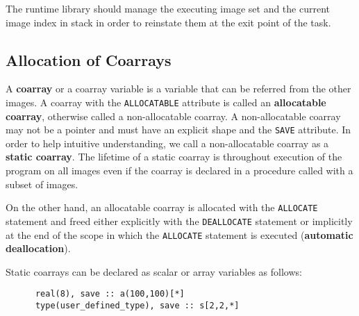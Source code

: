 
\requirement
The runtime library should manage the executing image set and the current image index 
in stack in order to reinstate them at the exit point of the task.


\subsection{Allocation of Coarrays}\label{sec:spec-coarray}

A {\bf coarray} or a coarray variable is a variable that can be referred from the other images. 
A coarray with the {\tt ALLOCATABLE} attribute is called an {\bf allocatable coarray}, 
otherwise called a non-allocatable coarray. A non-allocatable coarray may not be a pointer 
and must have an explicit shape and the {\tt SAVE} attribute. In order to help 
intuitive understanding, we call a non-allocatable coarray as a {\bf static coarray}. 
The lifetime of a static coarray is throughout execution of the program on all images even if
the coarray is declared in a procedure called with a subset of images.

On the other hand, an allocatable coarray is allocated with the {\tt ALLOCATE} statement and 
freed either explicitly with the {\tt DEALLOCATE} statement or implicitly at the end of the 
scope in which the {\tt ALLOCATE} statement is executed ({\bf automatic deallocation}).

Static coarrays can be declared as scalar or array variables as follows:
\begin{verbatim}
      real(8), save :: a(100,100)[*]
      type(user_defined_type), save :: s[2,2,*]
\end{verbatim}

